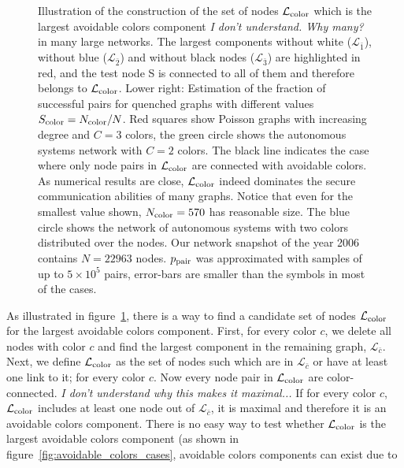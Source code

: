 \documentclass[aps, pre, twocolumn, a4paper, superscriptaddress, floatfix]{revtex4}
\newcommand{\red}{\color{red}\footnotesize}
\begin{document}
\begin{figure}[htb]
\begin{center}
    \caption{Illustration of the construction of the  set of nodes $\mathcal{L}_{\rm color}$ which is the largest avoidable colors component {\red \textit{I don't understand.  Why many?} in many large networks. }
    The largest components without white ($\mathcal{L}_{\bar 1}$), without blue ($\mathcal{L}_{\bar 2}$) and without 
    black nodes ($\mathcal{L}_{\bar 3}$) are highlighted in red, and the test node S is connected to 
    all of them and therefore belongs to $\mathcal{L}_{\rm color}$. Lower right: Estimation of the fraction 
    of successful pairs for quenched graphs with different values $S_{\rm color}=N_{\rm color}/N$. 
    Red squares show Poisson graphs with increasing degree and $C=3$ colors, the green circle 
    shows the autonomous systems network with $C=2$ colors. The black line indicates the case 
    where only node pairs in $\mathcal{L}_{\rm color}$ are connected with avoidable colors. As numerical 
    results are close, $\mathcal{L}_{\rm color}$ indeed dominates the secure communication abilities of many
    graphs.
    Notice that even for the smallest value shown, $N_{\rm color}=570$ has reasonable size. The blue circle shows the network of autonomous systems with two colors distributed over the nodes. Our network 
snapshot of the year 2006 contains $N=22963$ nodes. $p_{\rm pair}$ was approximated with 
samples of up to $5\times 10^5$ pairs, error-bars are smaller than the symbols in most 
of the cases. 
    }
    \label{fig:avoidable_colors_candidate}
\end{center}
\end{figure}
%
As illustrated in figure~\ref{fig:avoidable_colors_candidate}, 
there is a way to find a candidate set of nodes $\mathcal{L}_{\rm color}$ 
for the largest avoidable colors component.
First, for every color $c$, we delete all nodes with color $c$ 
and find the largest component in the remaining graph, $\mathcal{L}_{\bar c}$. 
Next, we define $\mathcal{L}_{\rm color}$ as the set of nodes such which are in $\mathcal{L}_{\bar c}$ or have at least one link to it; for every color $c$. 
Now every node pair in $\mathcal{L}_{\rm color}$ are color-connected. 
{\red \textit{I don't understand why this makes it maximal...}
If for every color $c$, $\mathcal{L}_{\rm color}$ includes at least one node out of $\mathcal{L}_{\bar c}$, 
it is maximal and therefore it is an avoidable colors component. }
There is no easy way to test whether $\mathcal{L}_{\rm color}$ is the largest avoidable colors component 
(as shown in figure~\ref{fig:avoidable_colors_cases}, avoidable colors components can exist due to 
\end{document}
